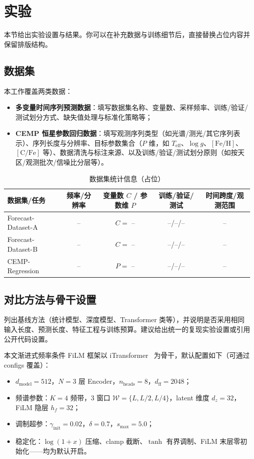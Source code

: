 \section{实验}
\label{sec:experiments}

本节给出实验设置与结果。你可以在补充数据与训练细节后，直接替换占位内容并保留排版结构。

\subsection{数据集}
本工作覆盖两类数据：
\begin{itemize}
  \item \textbf{多变量时间序列预测数据}：填写数据集名称、变量数、采样频率、训练/验证/测试划分方式、缺失值处理与标准化策略等；
  \item \textbf{CEMP 恒星参数回归数据}：填写观测序列类型（如光谱/测光/其它序列表示）、序列长度与分辨率、目标参数集合（\(P\) 维，如 \(T_{\mathrm{eff}}\)、\(\log g\)、\([\mathrm{Fe/H}]\)、\([\mathrm{C/Fe}]\) 等）、数据清洗与标注来源、以及训练/验证/测试划分原则（如按天区/观测批次/信噪比分层等）。
\end{itemize}

\begin{table}[t]
  \centering
  \caption{数据集统计信息（占位）}
  \label{tab:dataset_stats}
  \begin{tabular}{lcccc}
    \toprule
    数据集/任务 & 频率/分辨率 & 变量数 \(C\) / 参数维 \(P\) & 训练/验证/测试 & 时间跨度/观测范围 \\
    \midrule
    Forecast-Dataset-A & -- & \(C=\) -- & --/--/-- & -- \\
    Forecast-Dataset-B & -- & \(C=\) -- & --/--/-- & -- \\
    CEMP-Regression & -- & \(P=\) -- & --/--/-- & -- \\
    \bottomrule
  \end{tabular}
\end{table}

\subsection{对比方法与骨干设置}
列出基线方法（统计模型、深度模型、Transformer 类等），并说明是否采用相同输入长度、预测长度、特征工程与训练预算。建议给出统一的复现实验设置或引用公开代码设置。

本文渐进式频率条件 FiLM 框架以 iTransformer~\cite{itransformer} 为骨干，默认配置如下（可通过 configs 覆盖）：
\begin{itemize}
  \item \(d_{\text{model}} = 512\)，\(N = 3\) 层 Encoder，\(n_{\text{heads}} = 8\)，\(d_{\text{ff}} = 2048\)；
  \item 频谱参数：\(K = 4\) 频带，3 窗口 \(\mathcal{W} = \{L, L/2, L/4\}\)，latent 维度 \(d_z = 32\)，FiLM 隐层 \(h_f = 32\)；
  \item 调制超参：\(\gamma_{\text{init}} = 0.02\)，\(\delta = 0.7\)，\(s_{\max} = 5.0\)；
  \item 稳定化：\(\log(1+x)\) 压缩、clamp 截断、\(\tanh\) 有界调制、FiLM 末层零初始化——均为默认开启。
\end{itemize}

